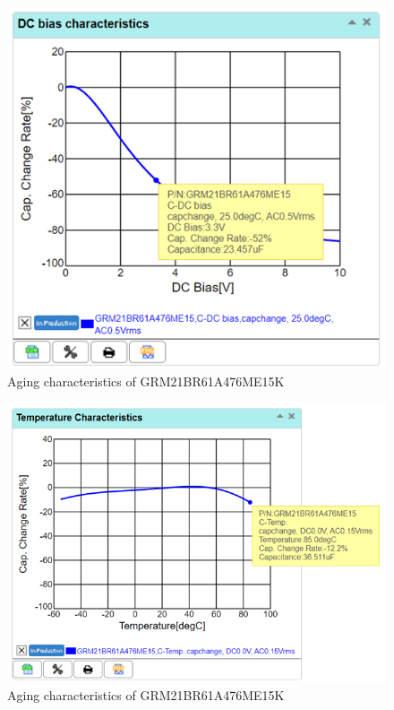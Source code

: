 \documentclass[a4paper,11pt]{article}%
\begin{document}
    \begin{figure}[H]
        \centering
        \includegraphics[width=\textwidth]{figures/Update5/DC bias characteristics of capacitor .png}
        \caption{Aging characteristics of GRM21BR61A476ME15K}
    \end{figure}

    \begin{figure}[H]
        \centering
        \includegraphics[width=\textwidth]{figures/Update5/Temperature characteristics of capacitor.png}
        \caption{Aging characteristics of GRM21BR61A476ME15K}
    \end{figure}
\end{document}
